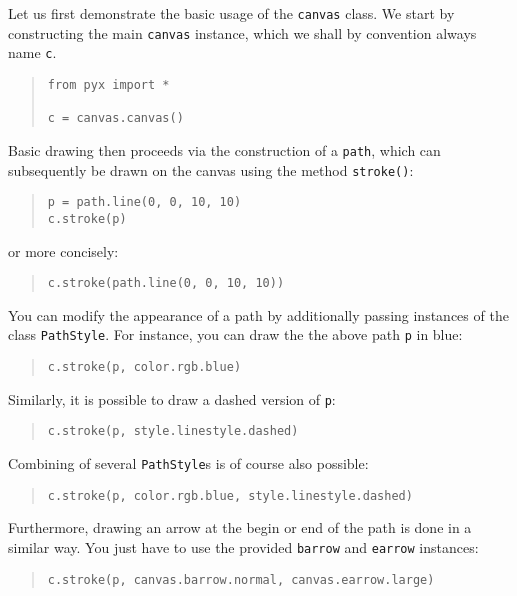 Let us first demonstrate the basic usage of the \texttt{canvas} class.
We start by constructing the main \verb|canvas| instance, which we
shall by convention always name \verb|c|.
\begin{quote}
\begin{verbatim}
from pyx import *

c = canvas.canvas()
\end{verbatim}
\end{quote}
Basic drawing then proceeds via the construction of a \verb|path|, which 
can subsequently be drawn on the canvas using the method \verb|stroke()|:
\begin{quote}
\begin{verbatim}
p = path.line(0, 0, 10, 10)
c.stroke(p)
\end{verbatim}
\end{quote}
or more concisely:
\begin{quote}
\begin{verbatim}
c.stroke(path.line(0, 0, 10, 10))
\end{verbatim}
\end{quote}
You can modify the appearance of a path by additionally passing 
instances of the class \verb|PathStyle|. For instance, you can draw the 
the above path \verb|p| in blue:
\begin{quote}
\begin{verbatim}
c.stroke(p, color.rgb.blue)
\end{verbatim}
\end{quote}
Similarly, it is possible to draw a dashed version of \verb|p|:
\begin{quote}
\begin{verbatim}
c.stroke(p, style.linestyle.dashed)
\end{verbatim}
\end{quote}
Combining of several \verb|PathStyle|s is of course also possible:
\begin{quote}
\begin{verbatim}
c.stroke(p, color.rgb.blue, style.linestyle.dashed)
\end{verbatim}
\end{quote}
Furthermore, drawing an arrow at the begin or end of the path is done
in a similar way. You just have to use the provided \verb|barrow| and 
\verb|earrow| instances:
\begin{quote}
\begin{verbatim}
c.stroke(p, canvas.barrow.normal, canvas.earrow.large)
\end{verbatim}
\end{quote}

